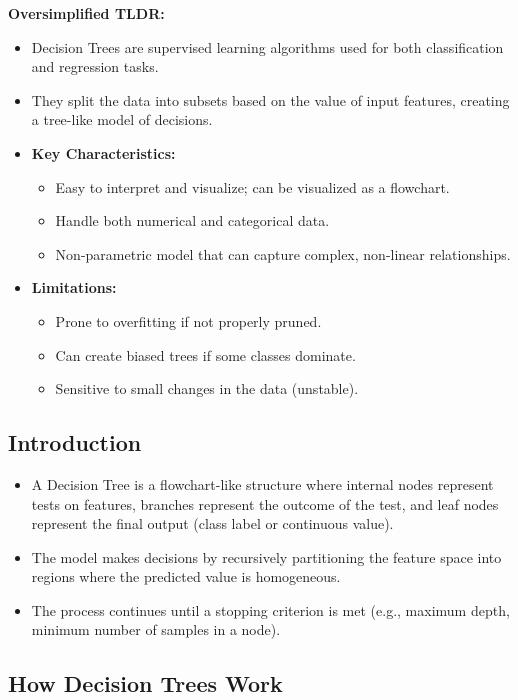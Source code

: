 \documentclass{article}
\begin{document}
\textbf{Oversimplified TLDR:}

\begin{itemize}
    \item Decision Trees are supervised learning algorithms used for both classification and regression tasks.
    \item They split the data into subsets based on the value of input features, creating a tree-like model of decisions.
    \item \textbf{Key Characteristics:}
    \begin{itemize}
        \item Easy to interpret and visualize; can be visualized as a flowchart.
        \item Handle both numerical and categorical data.
        \item Non-parametric model that can capture complex, non-linear relationships.
    \end{itemize}
    \item \textbf{Limitations:}
    \begin{itemize}
        \item Prone to overfitting if not properly pruned.
        \item Can create biased trees if some classes dominate.
        \item Sensitive to small changes in the data (unstable).
    \end{itemize}
\end{itemize}

\subsection{Introduction}

\begin{itemize}
    \item A Decision Tree is a flowchart-like structure where internal nodes represent tests on features, branches represent the outcome of the test, and leaf nodes represent the final output (class label or continuous value).
    \item The model makes decisions by recursively partitioning the feature space into regions where the predicted value is homogeneous.
    \item The process continues until a stopping criterion is met (e.g., maximum depth, minimum number of samples in a node).
\end{itemize}

\subsection{How Decision Trees Work}
\end{document}
